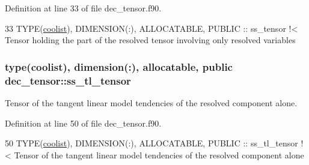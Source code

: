 Definition at line 33 of file dec\+\_\+tensor.\+f90.


\begin{DoxyCode}
33   \textcolor{keywordtype}{TYPE}(\hyperlink{structtensor_1_1coolist}{coolist}), \textcolor{keywordtype}{DIMENSION(:)}, \textcolor{keywordtype}{ALLOCATABLE}, \textcolor{keywordtype}{PUBLIC} :: ss\_tensor\textcolor{comment}{ !< Tensor holding the part of the
       resolved tensor involving only resolved variables}
\end{DoxyCode}
\subsubsection[{\texorpdfstring{ss\+\_\+tl\+\_\+tensor}{ss_tl_tensor}}]{\setlength{\rightskip}{0pt plus 5cm}type({\bf coolist}), dimension(\+:), allocatable, public dec\+\_\+tensor\+::ss\+\_\+tl\+\_\+tensor}\hypertarget{namespacedec__tensor_a5e65ad7fdc3a92172a2e45341284fc6b}{}\label{namespacedec__tensor_a5e65ad7fdc3a92172a2e45341284fc6b}


Tensor of the tangent linear model tendencies of the resolved component alone. 



Definition at line 50 of file dec\+\_\+tensor.\+f90.


\begin{DoxyCode}
50   \textcolor{keywordtype}{TYPE}(\hyperlink{structtensor_1_1coolist}{coolist}), \textcolor{keywordtype}{DIMENSION(:)}, \textcolor{keywordtype}{ALLOCATABLE}, \textcolor{keywordtype}{PUBLIC} :: ss\_tl\_tensor\textcolor{comment}{ !< Tensor of the tangent linear
       model tendencies of the resolved component alone}
\end{DoxyCode}
